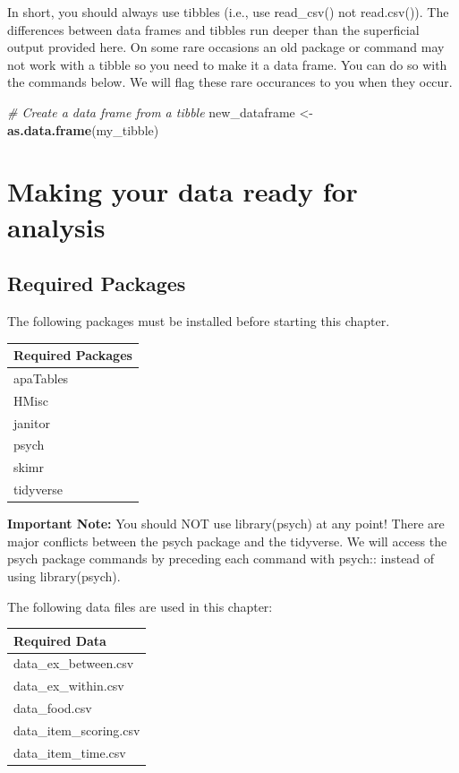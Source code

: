 \documentclass[
]{krantz}
\makeatletter
\newenvironment{Shaded}{\begin{snugshade}}{\end{snugshade}}
\newcommand{\CommentTok}[1]{\textcolor[rgb]{0.37,0.37,0.37}{\textit{#1}}}
\newcommand{\KeywordTok}[1]{\textcolor[rgb]{0.27,0.27,0.27}{\textbf{#1}}}
\newcommand{\NormalTok}[1]{#1}
\newcommand{\StringTok}[1]{\textcolor[rgb]{0.5,0.5,0.5}{#1}}
\newenvironment{kframe}{%
\medskip{}
\setlength{\fboxsep}{.8em}
 \def\at@end@of@kframe{}%
 \ifinner\ifhmode%
  \def\at@end@of@kframe{\end{minipage}}%
  \begin{minipage}{\columnwidth}%
 \fi\fi%
 \def\FrameCommand##1{\hskip\@totalleftmargin \hskip-\fboxsep
 \colorbox{shadecolor}{##1}\hskip-\fboxsep
     \hskip-\linewidth \hskip-\@totalleftmargin \hskip\columnwidth}%
 \MakeFramed {\advance\hsize-\width
   \@totalleftmargin\z@ \linewidth\hsize
   \@setminipage}}%
 {\par\unskip\endMakeFramed%
 \at@end@of@kframe}
\renewenvironment{Shaded}{\begin{kframe}}{\end{kframe}}
\makeatother
\begin{document}
In short, you should always use tibbles (i.e., use read\_csv() not read.csv()). The differences between data frames and tibbles run deeper than the superficial output provided here. On some rare occasions an old package or command may not work with a tibble so you need to make it a data frame. You can do so with the commands below. We will flag these rare occurances to you when they occur.

\begin{Shaded}
\begin{Highlighting}[]
\CommentTok{# Create a data frame from a tibble}
\NormalTok{new_dataframe <-}\StringTok{ }\KeywordTok{as.data.frame}\NormalTok{(my_tibble)}
\end{Highlighting}
\end{Shaded}

\hypertarget{making-your-data-ready-for-analysis}{%
\chapter{Making your data ready for analysis}\label{making-your-data-ready-for-analysis}}

\hypertarget{required-packages}{%
\section{Required Packages}\label{required-packages}}

The following packages must be installed before starting this chapter.

\begin{longtable}[]{@{}l@{}}
\toprule
Required Packages\tabularnewline
\midrule
\endhead
apaTables\tabularnewline
HMisc\tabularnewline
janitor\tabularnewline
psych\tabularnewline
skimr\tabularnewline
tidyverse\tabularnewline
\bottomrule
\end{longtable}

\textbf{Important Note:} You should NOT use library(psych) at any point! There are major conflicts between the psych package and the tidyverse. We will access the psych package commands by preceding each command with psych:: instead of using library(psych).

The following data files are used in this chapter:

\begin{longtable}[]{@{}l@{}}
\toprule
Required Data\tabularnewline
\midrule
\endhead
data\_ex\_between.csv\tabularnewline
data\_ex\_within.csv\tabularnewline
data\_food.csv\tabularnewline
data\_item\_scoring.csv\tabularnewline
data\_item\_time.csv\tabularnewline
\bottomrule
\end{longtable}
\end{document}
